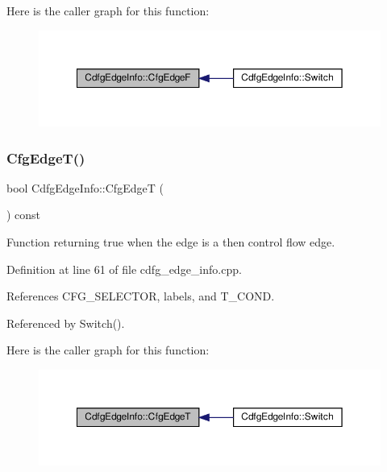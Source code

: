 Here is the caller graph for this function\+:
\nopagebreak
\begin{figure}[H]
\begin{center}
\leavevmode
\includegraphics[width=350pt]{d0/d89/structCdfgEdgeInfo_a28dff795df29d3612a5622a4acdf3136_icgraph}
\end{center}
\end{figure}
\mbox{\label{structCdfgEdgeInfo_af55cf6642e8a69596d1ec8ef3d1fd978}} 
\subsubsection{\texorpdfstring{Cfg\+Edge\+T()}{CfgEdgeT()}}
{\footnotesize\ttfamily bool Cdfg\+Edge\+Info\+::\+Cfg\+EdgeT (\begin{DoxyParamCaption}{ }\end{DoxyParamCaption}) const}



Function returning true when the edge is a then control flow edge. 



Definition at line 61 of file cdfg\+\_\+edge\+\_\+info.\+cpp.



References C\+F\+G\+\_\+\+S\+E\+L\+E\+C\+T\+OR, labels, and T\+\_\+\+C\+O\+ND.



Referenced by Switch().

Here is the caller graph for this function\+:
\nopagebreak
\begin{figure}[H]
\begin{center}
\leavevmode
\includegraphics[width=350pt]{d0/d89/structCdfgEdgeInfo_af55cf6642e8a69596d1ec8ef3d1fd978_icgraph}
\end{center}
\end{figure}
\mbox{\label{structCdfgEdgeInfo_ae5c707c6af7c0553144247c0f255d26b}} 
